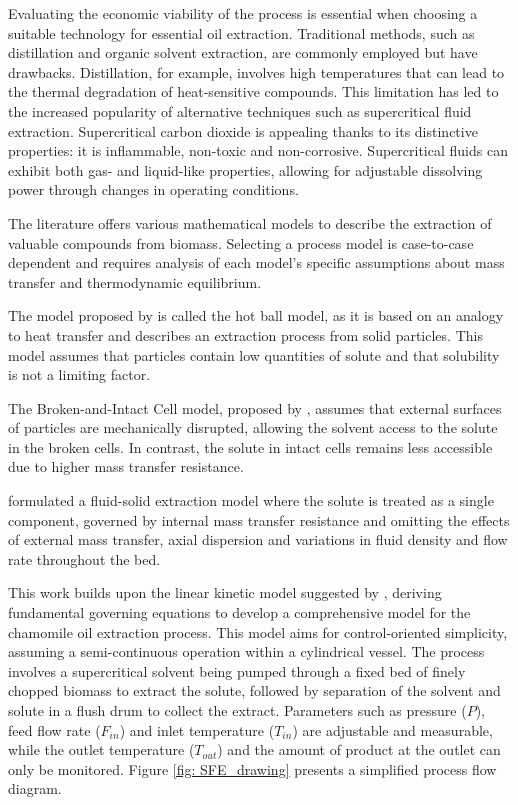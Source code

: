 \documentclass[a4paper,fleqn]{cas-dc}
\begin{document}
Evaluating the economic viability of the process is essential when choosing a suitable technology for essential oil extraction. Traditional methods, such as distillation and organic solvent extraction, are commonly employed but have drawbacks. Distillation, for example, involves high temperatures that can lead to the thermal degradation of heat-sensitive compounds. This limitation has led to the increased popularity of alternative techniques such as supercritical fluid extraction. Supercritical carbon dioxide is appealing thanks to its distinctive properties: it is inflammable, non-toxic and non-corrosive. Supercritical fluids can exhibit both gas- and liquid-like properties, allowing for adjustable dissolving power through changes in operating conditions.

The literature offers various mathematical models to describe the extraction of valuable compounds from biomass. Selecting a process model is case-to-case dependent and requires analysis of each model's specific assumptions about mass transfer and thermodynamic equilibrium.

The model proposed by \citet{Reverchon1993} is called the hot ball model, as it is based on an analogy to heat transfer and describes an extraction process from solid particles. This model assumes that particles contain low quantities of solute and that solubility is not a limiting factor.

The Broken-and-Intact Cell model, proposed by \citet{Sovova1994}, assumes that external surfaces of particles are mechanically disrupted, allowing the solvent access to the solute in the broken cells. In contrast, the solute in intact cells remains less accessible due to higher mass transfer resistance.

\citet{Reverchon1996} formulated a fluid-solid extraction model where the solute is treated as a single component, governed by internal mass transfer resistance and omitting the effects of external mass transfer, axial dispersion and variations in fluid density and flow rate throughout the bed.

This work builds upon the linear kinetic model suggested by \citet{Reverchon1996}, deriving fundamental governing equations to develop a comprehensive model for the chamomile oil extraction process. This model aims for control-oriented simplicity, assuming a semi-continuous operation within a cylindrical vessel. The process involves a supercritical solvent being pumped through a fixed bed of finely chopped biomass to extract the solute, followed by separation of the solvent and solute in a flush drum to collect the extract. Parameters such as pressure ($P$), feed flow rate ($F_{in}$) and inlet temperature ($T_{in}$) are adjustable and measurable, while the outlet temperature ($T_{out}$) and the amount of product at the outlet can only be monitored. Figure \ref{fig: SFE_drawing} presents a simplified process flow diagram.
\end{document}
